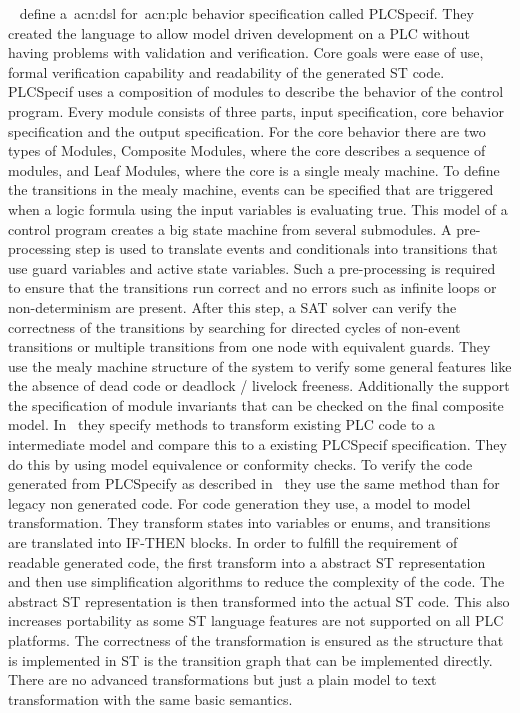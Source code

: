 \citeauthor{7819191}~\cite{7819191, darvas2015syntax, darvas2015requirements, darvas2015formal, 10.1007/978-3-319-33693-0_32} define a~\acrshort{acn:dsl} for~\acrshort{acn:plc} behavior specification called PLCSpecif.
They created the language to allow model driven development on a PLC without having problems with validation and verification.
Core goals were ease of use, formal verification capability and readability of the generated ST code.
PLCSpecif uses a composition of modules to describe the behavior of the control program.
Every module consists of three parts, input specification, core behavior specification and the output specification.
For the core behavior there are two types of Modules, Composite Modules, where the core describes a sequence of modules, and Leaf Modules, where the core is a single mealy machine.
To define the transitions in the mealy machine, events can be specified that are triggered when a logic formula using the input variables is evaluating true.
This model of a control program creates a big state machine from several submodules.
A pre-processing step is used to translate events and conditionals into transitions that use guard variables and active state variables.
Such a pre-processing is required to ensure that the transitions run correct and no errors such as infinite loops or non-determinism are present.
After this step, a SAT solver can verify the correctness of the  transitions by searching for directed cycles of non-event transitions or multiple transitions from one node with equivalent guards.
They use the mealy machine structure of the system to verify some general features like the absence of dead code or deadlock / livelock freeness.
Additionally the support the specification of module invariants that can be checked on the final composite model.
In~\cite{10.1007/978-3-319-33693-0_32} they specify methods to transform existing PLC code to a intermediate model and compare this to a existing PLCSpecif specification.
They do this by using model equivalence or conformity checks.
To verify the code generated from PLCSpecify as described in~\cite{7819191} they use the same method than for legacy non generated code.
For code generation they use, a model to model transformation.
They transform states into variables or enums, and transitions are translated into IF-THEN blocks.
In order to fulfill the requirement of readable generated code, the first transform into a abstract ST representation and then use simplification algorithms to reduce the complexity of the code.
The abstract ST representation is then transformed into the actual ST code.
This also increases portability as some ST language features are not supported on all PLC platforms.
The correctness of the transformation is ensured as the structure that is implemented in ST is the transition graph that can be implemented directly.
There are no advanced transformations but just a plain model to text transformation with the same basic semantics.

